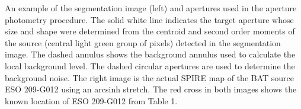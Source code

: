 \label{fig:example_photometry} An example of the segmentation image (left) and apertures used in the aperture photometry procedure. The solid white line indicates the target aperture whose size and shape were determined from the centroid and second order moments of the source (central light green group of pixels)  detected in the segmentation image. The dashed annulus shows the background annulus used to calculate the local background level. The dashed circular apertures are used to determine the background noise. The right image is the actual SPIRE map of the BAT source ESO 209-G012 using an arcsinh stretch. The red cross in both images shows the known location of ESO 209-G012 from Table 1.
  